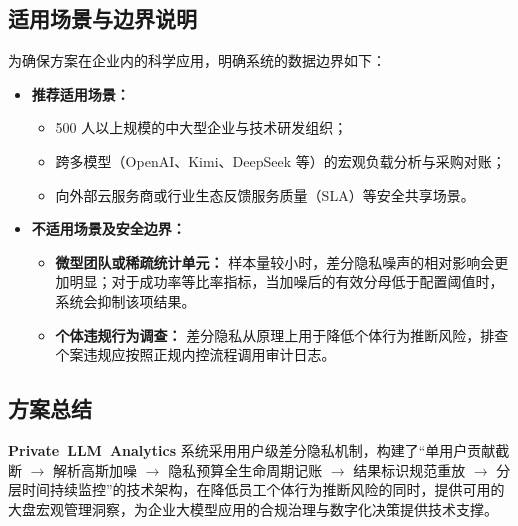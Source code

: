 \subsection{适用场景与边界说明}
为确保方案在企业内的科学应用，明确系统的数据边界如下：
\begin{itemize}[leftmargin=1.8em, itemsep=1pt]
  \item \textbf{推荐适用场景：}
  \begin{itemize}[itemsep=1pt]
    \item 500 人以上规模的中大型企业与技术研发组织；
    \item 跨多模型（OpenAI、Kimi、DeepSeek 等）的宏观负载分析与采购对账；
    \item 向外部云服务商或行业生态反馈服务质量（SLA）等安全共享场景。
  \end{itemize}
  \item \textbf{不适用场景及安全边界：}
  \begin{itemize}[itemsep=1pt]
    \item \textbf{微型团队或稀疏统计单元：} 样本量较小时，差分隐私噪声的相对影响会更加明显；对于成功率等比率指标，当加噪后的有效分母低于配置阈值时，系统会抑制该项结果。
    \item \textbf{个体违规行为调查：} 差分隐私从原理上用于降低个体行为推断风险，排查个案违规应按照正规内控流程调用审计日志。
  \end{itemize}
\end{itemize}

\subsection{方案总结}
\textbf{\mbox{Private LLM Analytics}} 系统采用用户级差分隐私机制，构建了“单用户贡献截断 $\to$ 解析高斯加噪 $\to$ 隐私预算全生命周期记账 $\to$ 结果标识规范重放 $\to$ 分层时间持续监控”的技术架构，在降低员工个体行为推断风险的同时，提供可用的大盘宏观管理洞察，为企业大模型应用的合规治理与数字化决策提供技术支撑。
